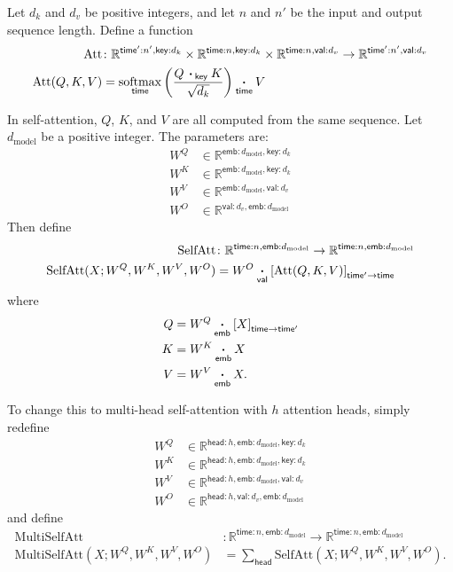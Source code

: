 \documentclass{article}
\newcommand{\name}[1]{\mathsf{#1}}
\newcommand{\ndot}[1]{\mathbin{\mathop{\thinspace\boldsymbol\cdot\thinspace}\displaylimits_{\name{#1}}}}
\newcommand{\nsum}[1]{\mathop{\sum}_{\name{#1}}}
\DeclareMathOperator*{\softmax}{softmax}
\newcommand{\dmodel}{d_{\text{model}}}
\begin{document}
Let $d_k$ and $d_v$ be positive integers, and let $n$ and $n'$ be the input and output sequence length. Define a function
\begin{align*}
  \text{Att} &\colon \mathbb{R}^{\name{time'}:n',\name{key}:d_k} \times \mathbb{R}^{\name{time}:n,\name{key}:d_k} \times \mathbb{R}^{\name{time}:n,\name{val}:d_v} \rightarrow \mathbb{R}^{\name{time'}:n',\name{val}:d_v} \\
  \text{Att}(Q,K,V) &= \softmax_{\name{time}} \left( \frac{Q \ndot{key} K}{\sqrt{d_k}} \right) \ndot{time} V
\end{align*}

In self-attention, $Q$, $K$, and $V$ are all computed from the same sequence.  Let $\dmodel$ be a positive integer. The parameters are:
\begin{align*}
  W^Q &\in \mathbb{R}^{\name{emb}:\dmodel, \name{key}:d_k} \\
  W^K &\in \mathbb{R}^{\name{emb}:\dmodel, \name{key}:d_k} \\
  W^V &\in \mathbb{R}^{\name{emb}:\dmodel, \name{val}:d_v} \\
  W^O &\in \mathbb{R}^{\name{val}:d_v, \name{emb}:\dmodel}
\end{align*}
Then define
\begin{align*}
  \text{SelfAtt} &\colon \mathbb{R}^{\name{time}:n,\name{emb}:\dmodel} \rightarrow \mathbb{R}^{\name{time}:n,\name{emb}:\dmodel} \\
  \text{SelfAtt}(X; W^Q, W^K, W^V, W^O) &= W^O \ndot{val} \left[\text{Att}(Q, K, V)\right]_{\name{time'}\rightarrow\name{time}}
\end{align*}
where
\begin{align*}
  Q &= W^Q \ndot{emb} \left[X\right]_{\name{time}\rightarrow\name{time'}} \\
  K &= W^K \ndot{emb} X \\
  V &= W^V \ndot{emb} X.
\end{align*}

To change this to multi-head self-attention with $h$ attention heads, simply redefine 
\begin{align*}
  W^Q &\in \mathbb{R}^{\name{head}:h, \name{emb}:\dmodel, \name{key}:d_k} \\
  W^K &\in \mathbb{R}^{\name{head}:h, \name{emb}:\dmodel, \name{key}:d_k} \\
  W^V &\in \mathbb{R}^{\name{head}:h, \name{emb}:\dmodel, \name{val}:d_v} \\
  W^O &\in \mathbb{R}^{\name{head}:h, \name{val}:d_v, \name{emb}:\dmodel}
\end{align*}
and define
\begin{align*}
\text{MultiSelfAtt} &\colon \mathbb{R}^{\name{time}:n,\name{emb}:\dmodel} \rightarrow \mathbb{R}^{\name{time}:n,\name{emb}:\dmodel} \\
\text{MultiSelfAtt}(X; W^Q, W^K, W^V, W^O) &= \nsum{head} \text{SelfAtt}(X; W^Q, W^K, W^V, W^O).
\end{align*}
\end{document}
